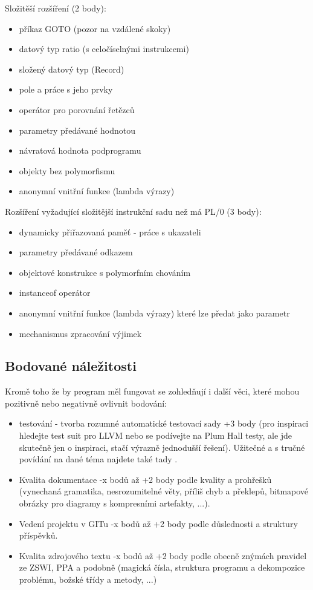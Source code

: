 \documentclass[12pt, a4paper]{article}
\begin{document}
\noindent Složitěší rozšíření (2 body):
\begin{itemize}
\item příkaz GOTO (pozor na vzdálené skoky)
\item datový typ ratio (s celočíselnými instrukcemi)
\item složený datový typ (Record)
\item pole a práce s jeho prvky
\item operátor pro porovnání řetězců
\item parametry předávané hodnotou
\item návratová hodnota podprogramu
\item objekty bez polymorfismu
\item anonymní vnitřní funkce (lambda výrazy)
\end{itemize}


\noindent Rozšíření vyžadující složitější instrukční sadu než má PL/0 (3 body):
\begin{itemize}
\item dynamicky přiřazovaná paměť - práce s ukazateli
\item parametry předávané odkazem
\item objektové konstrukce s polymorfním chováním
\item instanceof operátor
\item anonymní vnitřní funkce (lambda výrazy) které lze předat jako parametr
\item mechanismus zpracování výjimek
\end{itemize}

\subsection{Bodované náležitosti}
Kromě toho že by program měl fungovat se zohledňují i další věci, které mohou pozitivně nebo negativně ovlivnit bodování:
\begin{itemize}
\item testování - tvorba rozumné automatické testovací sady +3 body (pro inspiraci hledejte test suit pro LLVM nebo se podívejte na Plum Hall testy, ale jde skutečně jen o inspiraci, stačí výrazně jednodušší řešení). Užitečné a s tručné povídání na dané téma najdete také tady .
\item Kvalita dokumentace -x bodů až +2 body podle kvality a prohřešků (vynechaná gramatika, nesrozumitelné věty, příliš chyb a překlepů, bitmapové obrázky pro diagramy s kompresními artefakty, ...).
\item Vedení projektu v GITu -x bodů až +2 body podle důslednosti a struktury příspěvků.
\item Kvalita zdrojového textu -x bodů až +2 body podle obecně znýmách pravidel ze ZSWI, PPA a podobně (magická čísla, struktura programu a dekompozice problému, božské třídy a metody, ...)
\end{itemize}
\end{document}
